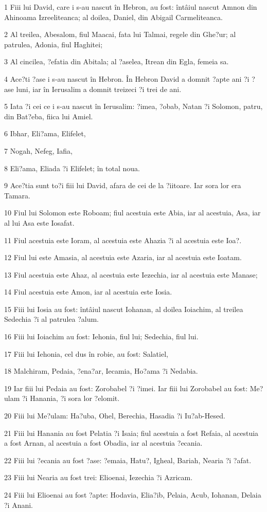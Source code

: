 \par 1 Fiii lui David, care i s-au nascut în Hebron, au fost: întâiul nascut Amnon din Ahinoama Izreeliteanca; al doilea, Daniel, din Abigail Carmeliteanca.
\par 2 Al treilea, Abesalom, fiul Maacai, fata lui Talmai, regele din Ghe?ur; al patrulea, Adonia, fiul Haghitei;
\par 3 Al cincilea, ?efatia din Abitala; al ?aselea, Itrean din Egla, femeia sa.
\par 4 Ace?ti ?ase i s-au nascut în Hebron. În Hebron David a domnit ?apte ani ?i ?ase luni, iar în Ierusalim a domnit treizeci ?i trei de ani.
\par 5 Iata ?i cei ce i s-au nascut în Ierusalim: ?imea, ?obab, Natan ?i Solomon, patru, din Bat?eba, fiica lui Amiel.
\par 6 Ibhar, Eli?ama, Elifelet,
\par 7 Nogah, Nefeg, Iafia,
\par 8 Eli?ama, Eliada ?i Elifelet; în total noua.
\par 9 Ace?tia sunt to?i fiii lui David, afara de cei de la ?iitoare. Iar sora lor era Tamara.
\par 10 Fiul lui Solomon este Roboam; fiul acestuia este Abia, iar al acestuia, Asa, iar al lui Asa este Iosafat.
\par 11 Fiul acestuia este Ioram, al acestuia este Ahazia ?i al acestuia este Ioa?.
\par 12 Fiul lui este Amasia, al acestuia este Azaria, iar al acestuia este Ioatam.
\par 13 Fiul acestuia este Ahaz, al acestuia este Iezechia, iar al acestuia este Manase;
\par 14 Fiul acestuia este Amon, iar al acestuia este Iosia.
\par 15 Fiii lui Iosia au fost: întâiul nascut Iohanan, al doilea Ioiachim, al treilea Sedechia ?i al patrulea ?alum.
\par 16 Fiii lui Ioiachim au fost: Iehonia, fiul lui; Sedechia, fiul lui.
\par 17 Fiii lui Iehonia, cel dus în robie, au fost: Salatiel,
\par 18 Malchiram, Pedaia, ?ena?ar, Iecamia, Ho?ama ?i Nedabia.
\par 19 Iar fiii lui Pedaia au fost: Zorobabel ?i ?imei. Iar fiii lui Zorobabel au fost: Me?ulam ?i Hanania, ?i sora lor ?elomit.
\par 20 Fiii lui Me?ulam: Ha?uba, Ohel, Berechia, Hasadia ?i Iu?ab-Hesed.
\par 21 Fiii lui Hanania au fost Pelatia ?i Isaia; fiul acestuia a fost Refaia, al acestuia a fost Arnan, al acestuia a fost Obadia, iar al acestuia ?ecania.
\par 22 Fiii lui ?ecania au fost ?ase: ?emaia, Hatu?, Igheal, Bariah, Nearia ?i ?afat.
\par 23 Fiii lui Nearia au fost trei: Elioenai, Iezechia ?i Azricam.
\par 24 Fiii lui Elioenai au fost ?apte: Hodavia, Elia?ib, Pelaia, Acub, Iohanan, Delaia ?i Anani.


